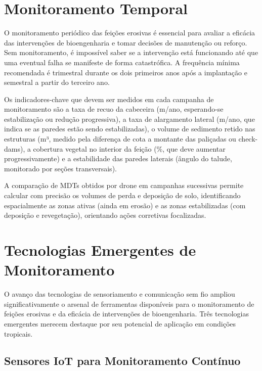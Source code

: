 \documentclass[
  portuguese,
  11pt,
  a4paper,
  open=any]{scrbook}
\begin{document}
\section{Monitoramento Temporal}\label{monitoramento-temporal}

O monitoramento periódico das feições erosivas é essencial para avaliar
a eficácia das intervenções de bioengenharia e tomar decisões de
manutenção ou reforço. Sem monitoramento, é impossível saber se a
intervenção está funcionando até que uma eventual falha se manifeste de
forma catastrófica. A frequência mínima recomendada é trimestral durante
os dois primeiros anos após a implantação e semestral a partir do
terceiro ano.

Os indicadores-chave que devem ser medidos em cada campanha de
monitoramento são a taxa de recuo da cabeceira (m/ano, esperando-se
estabilização ou redução progressiva), a taxa de alargamento lateral
(m/ano, que indica se as paredes estão sendo estabilizadas), o volume de
sedimento retido nas estruturas (m³, medido pela diferença de cota a
montante das paliçadas ou check-dams), a cobertura vegetal no interior
da feição (\%, que deve aumentar progressivamente) e a estabilidade das
paredes laterais (ângulo do talude, monitorado por seções transversais).

A comparação de MDTs obtidos por drone em campanhas sucessivas permite
calcular com precisão os volumes de perda e deposição de solo,
identificando espacialmente as zonas ativas (ainda em erosão) e as zonas
estabilizadas (com deposição e revegetação), orientando ações corretivas
focalizadas.

\section{Tecnologias Emergentes de
Monitoramento}\label{tecnologias-emergentes-de-monitoramento}

O avanço das tecnologias de sensoriamento e comunicação sem fio ampliou
significativamente o arsenal de ferramentas disponíveis para o
monitoramento de feições erosivas e da eficácia de intervenções de
bioengenharia. Três tecnologias emergentes merecem destaque por seu
potencial de aplicação em condições tropicais.

\subsection{Sensores IoT para Monitoramento
Contínuo}\label{sensores-iot-para-monitoramento-contuxednuo}
\end{document}
